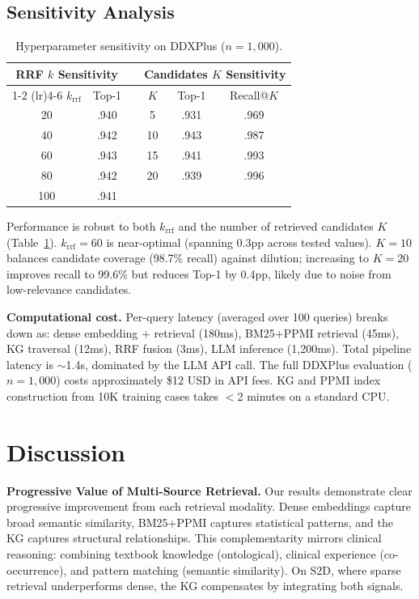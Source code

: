 \documentclass[runningheads]{llncs}
\begin{document}
\subsection{Sensitivity Analysis}
\label{sec:sensitivity}

\begin{table}[t]
\centering
\caption{Hyperparameter sensitivity on DDXPlus ($n{=}1{,}000$).}
\label{tab:sensitivity}
\begin{tabular}{cccccc}
\toprule
\multicolumn{2}{c}{\textbf{RRF $k$ Sensitivity}} & & \multicolumn{3}{c}{\textbf{Candidates $K$ Sensitivity}} \\
\cmidrule(lr){1-2} \cmidrule(lr){4-6}
$k_{\text{rrf}}$ & Top-1 & & $K$ & Top-1 & Recall@$K$ \\
\midrule
20  & .940 & & 5  & .931 & .969 \\
40  & .942 & & 10 & .943 & .987 \\
60  & .943 & & 15 & .941 & .993 \\
80  & .942 & & 20 & .939 & .996 \\
100 & .941 & & & & \\
\bottomrule
\end{tabular}
\end{table}

Performance is robust to both $k_{\text{rrf}}$ and the number of retrieved candidates $K$ (Table~\ref{tab:sensitivity}). $k_{\text{rrf}}{=}60$ is near-optimal (spanning 0.3pp across tested values). $K{=}10$ balances candidate coverage (98.7\% recall) against dilution; increasing to $K{=}20$ improves recall to 99.6\% but reduces Top-1 by 0.4pp, likely due to noise from low-relevance candidates.

\textbf{Computational cost.} Per-query latency (averaged over 100 queries) breaks down as: dense embedding + retrieval (180ms), BM25+PPMI retrieval (45ms), KG traversal (12ms), RRF fusion (3ms), LLM inference (1,200ms). Total pipeline latency is ${\sim}$1.4s, dominated by the LLM API call. The full DDXPlus evaluation ($n{=}1{,}000$) costs approximately \$12 USD in API fees. KG and PPMI index construction from 10K training cases takes $<$2 minutes on a standard CPU.

\section{Discussion}
\label{sec:discussion}

\textbf{Progressive Value of Multi-Source Retrieval.}
Our results demonstrate clear progressive improvement from each retrieval modality. Dense embeddings capture broad semantic similarity, BM25+PPMI captures statistical patterns, and the KG captures structural relationships. This complementarity mirrors clinical reasoning: combining textbook knowledge (ontological), clinical experience (co-occurrence), and pattern matching (semantic similarity). On S2D, where sparse retrieval underperforms dense, the KG compensates by integrating both signals.
\end{document}
